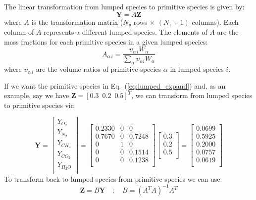 The linear transformation from lumped species to primitive species is given by: 
\begin{equation}\label{eq:transform}
\textbf{Y}=A\textbf{Z} 
\end{equation}
where $A$ is the transformation matrix ($N_{y}$ rows $\times$ $(N_{z}+1)$ columns).  Each column of $A$ represents a different lumped species.  The elements of $A$ are the mass fractions for each primitive species in a given lumped species:
\begin{equation}\label{eq:A_def}
A_{\alpha\,i} = \frac{\upsilon_{\alpha\,i}W_{\alpha}}{\displaystyle \sum_{\alpha}\upsilon_{\alpha i}W_{\alpha}}
\end{equation}
where $\upsilon_{\alpha\,i}$ are the volume ratios of primitive species $\alpha$ in lumped species $i$.

If we want the primitive species in Eq.~(\ref{eq:lumped_expand}) and, as an example, say we have $\mathbf{Z} = [0.3 \,\,\, 0.2 \,\,\, 0.5]^T$, we can transform from lumped species to primitive species via

\begin{equation}\label{eq:transform_to_primitive}
\mathbf{Y}=\left[\begin{array}{c}
       Y_{O_2} \\
       Y_{N_2} \\
       Y_{CH_4} \\
       Y_{CO_2} \\
       Y_{H_2O} \\
     \end{array}\right]
     =\left[\begin{array}{ccc}
     0.2330 & 0 & 0 \\
     0.7670 & 0 & 0.7248 \\
     0 & 1 & 0 \\
     0 & 0 & 0.1514 \\
     0 & 0 & 0.1238 \\
     \end{array}\right]
     \left[\begin{array}{c}
     0.3 \\
     0.2 \\
     0.5 \\
     \end{array}\right]
     =\left[\begin{array}{c}
     0.0699\\
     0.5925\\
     0.2000\\
     0.0757\\
     0.0619\\
     \end{array}\right]
\end{equation}
To transform back to lumped species from primitive species we can use:
\begin{equation}\label{eq:transform_back}
\textbf{Z}=B\textbf{Y} \quad ; \quad B=(A^TA)^{-1}A^T
\end{equation}

